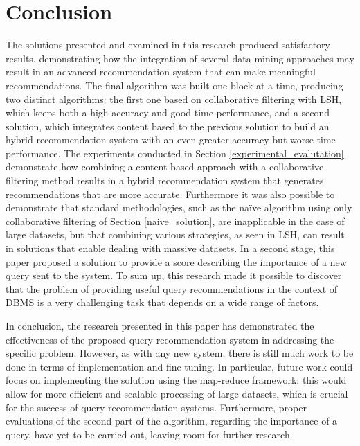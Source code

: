 \section{Conclusion}

The solutions presented and examined in this research produced satisfactory results, demonstrating how the integration of several data mining approaches may result in an advanced recommendation system that can make meaningful recommendations. The final algorithm was built one block at a time, producing two distinct algorithms: the first one based on collaborative filtering with LSH, which keeps both a high accuracy and good time performance, and a second solution, which integrates content based to the previous solution to build an hybrid recommendation system with an even greater accuracy but worse time performance. The experiments conducted in Section \ref{experimental_evalutation} demonstrate how combining a content-based approach with a collaborative filtering method results in a hybrid recommendation system that generates recommendations that are more accurate. Furthermore it was also possible to demonstrate that standard methodologies, such as the naïve algorithm using only collaborative filtering of Section \ref{naive_solution}, are inapplicable in the case of large datasets, but that combining various strategies, as seen in LSH, can result in solutions that enable dealing with massive datasets. In a second stage, this paper proposed a solution to provide a score describing the importance of a new query sent to the system. To sum up, this research made it possible to discover that the problem of providing useful query recommendations in the context of DBMS is a very challenging task that depends on a wide range of factors. 


In conclusion, the research presented in this paper has demonstrated the effectiveness of the proposed query recommendation system in addressing the specific problem. However, as with any new system, there is still much work to be done in terms of implementation and fine-tuning. In particular, future work could focus on implementing the solution using the map-reduce framework: this would allow for more efficient and scalable processing of large datasets, which is crucial for the success of query recommendation systems. Furthermore, proper evaluations of the second part of the algorithm, regarding the importance of a query, have yet to be carried out, leaving room for further research.
